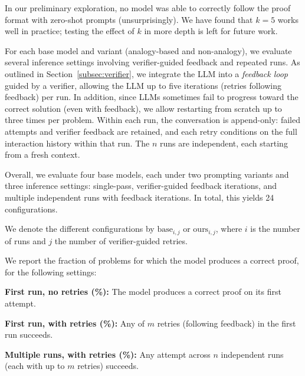 

 In our preliminary exploration, no model was able to correctly follow the proof format with zero-shot prompts (unsurprisingly). We have found that $k=5$ works well in practice; testing the effect of $k$ in more depth is left for future work.





For each base model and variant (analogy-based and non-analogy), we evaluate several inference settings involving verifier-guided feedback and repeated runs.
As outlined in Section~\ref{subsec:verifier}, we integrate the LLM into a \emph{feedback loop} guided by a verifier, allowing the LLM up to five iterations (retries following feedback) per run.  
In addition, since LLMs sometimes fail to progress toward the correct solution (even with feedback), we allow restarting from scratch up to three times per problem.
Within each run, the conversation is append-only: failed attempts and verifier feedback are retained, and each retry conditions on the full interaction history within that run. The $n$ runs are independent, each starting from a fresh context.



Overall, we evaluate four base models, each under two prompting variants and three inference settings: single-pass, verifier-guided feedback iterations, and multiple independent runs with feedback iterations. 
In total, this yields 24 configurations.

We denote the different configurations by $\text{base}_{i,j}$ or $\text{ours}_{i,j}$,
where $i$ is the number of runs and $j$ the number of verifier-guided retries.


We report the fraction of problems for which the model produces a correct proof, for the following settings:
\begin{compactitem}
    \item \textbf{First run, no retries (\%):} The model produces a correct proof on its first attempt.
    \item \textbf{First run, with retries (\%):} Any of $m$ retries (following feedback) in the first run succeeds.
    \item \textbf{Multiple runs, with retries (\%):}  Any attempt across $n$ independent runs (each with up to $m$ retries) succeeds.
\end{compactitem}





